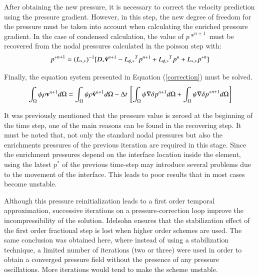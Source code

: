 After obtaining the new pressure, it is necessary to correct the velocity prediction using the pressure gradient. However, in this step, the new degree of freedom for the pressure must be taken into account when calculating the enriched pressure gradient. In the case of condensed calculation, the value of $p*^{n+1}$ must be recovered from the nodal pressures calculated in the poisson step with:
\begin{equation}
  {p^*}^{n+1} = {(L_{*,*})}^{-1}[D_* \hat{\mathbf{v}}^{n+1} - {L_{\phi,*}}^Tp^{n+1} + {L_{\phi,*}}^Tp^{n} + L_{*,*}{p^*}^n]
  \label{recovering}
\end{equation}

Finally, the equation system presented in Equation (\ref{correction}) must be solved.
 \begin{equation}
  \int_{\Omega} \psi \rho \vv^{n+1} d\Omega = \int_{\Omega} \psi \rho \hat{\vv}^{n+1} d\Omega - \Delta t \ \left[\int_{\Omega} \psi \nabla \delta p^{n+1} d\Omega + \int_{\Omega} \psi \nabla \delta {p^*}^{n+1} d\Omega \right]
  \label{correction}
 \end{equation}

It was previously mentioned that the pressure value is zeroed at the beginning of the time step, one of the main reasons can be found in the recovering step. It must be noted that, not only the standard nodal pressures but also the enrichments pressures of the previous iteration are required in this stage. Since the enrichment pressures depend on the interface location inside the element, using the latest $p^*$ of the previous time-step may introduce several problems due to the movement of the interface. This leads to poor results that in most cases become unstable.

Although this pressure reinitialization leads to a first order temporal approximation, successive iterations on a pressure-correction loop improve the incompressibility of the solution. Idelsohn\cite{Idelsohn13c} ensures that the stabilization effect of the first order fractional step is lost when higher order schemes are used. The same conclusion was obtained here, where instead of using a stabilization technique, a limited number of iterations (two or three) were used in order to obtain a converged pressure field without the presence of any pressure oscillations. More iterations would tend to make the scheme unstable. 